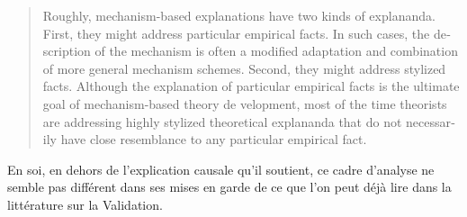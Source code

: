 \foreignblockquote{english}[\cite{Hedstrom2010}]{Roughly, mechanism-based explanations have two kinds of explananda. First, they might address particular empirical facts. In such cases, the description of the mechanism is often a modified adaptation and combination of more general mechanism schemes. Second, they might address stylized facts. Although the explanation of particular empirical facts is the ultimate goal of mechanism-based theory de velopment, most of the time theorists are addressing highly stylized theoretical explananda that do not necessarily have close resemblance to any particular empirical fact. }

En soi, en dehors de l'explication causale qu'il soutient, ce cadre d'analyse ne semble pas différent dans ses mises en garde de ce que l'on peut déjà lire dans la littérature sur la Validation. %



